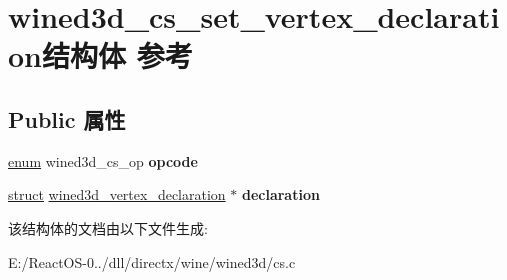 \hypertarget{structwined3d__cs__set__vertex__declaration}{}\section{wined3d\+\_\+cs\+\_\+set\+\_\+vertex\+\_\+declaration结构体 参考}
\label{structwined3d__cs__set__vertex__declaration}
\subsection*{Public 属性}
\begin{DoxyCompactItemize}
\item 
\mbox{\label{structwined3d__cs__set__vertex__declaration_a832146c0ec22756c4c2defd7933e9f30}} 
\hyperlink{interfaceenum}{enum} wined3d\+\_\+cs\+\_\+op {\bfseries opcode}
\item 
\mbox{\label{structwined3d__cs__set__vertex__declaration_af76bd056f061496bc43db7e1362a5425}} 
\hyperlink{interfacestruct}{struct} \hyperlink{structwined3d__vertex__declaration}{wined3d\+\_\+vertex\+\_\+declaration} $\ast$ {\bfseries declaration}
\end{DoxyCompactItemize}


该结构体的文档由以下文件生成\+:\begin{DoxyCompactItemize}
\item 
E\+:/\+React\+O\+S-\/0../dll/directx/wine/wined3d/cs.\+c\end{DoxyCompactItemize}
